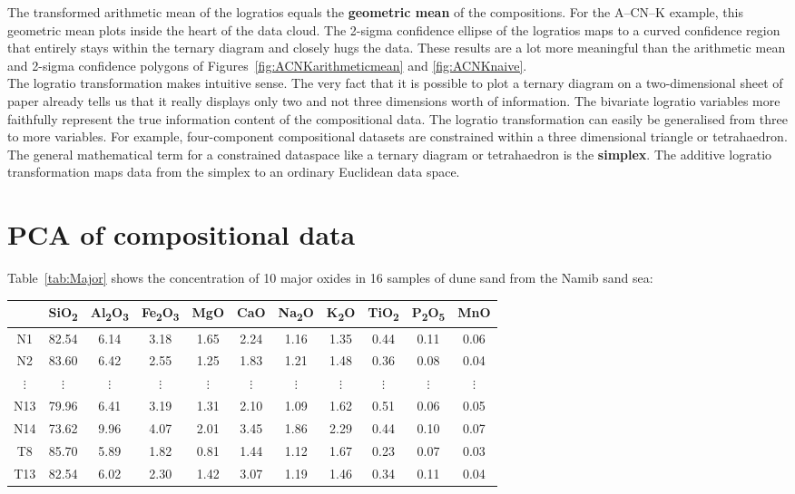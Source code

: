 The transformed arithmetic mean of the logratios equals the
\textbf{geometric mean} of the compositions. For the A--CN--K example,
this geometric mean plots inside the heart of the data cloud. The
2-sigma confidence ellipse of the logratios maps to a curved
confidence region that entirely stays within the ternary diagram and
closely hugs the data. These results are a lot more meaningful than
the arithmetic mean and 2-sigma confidence polygons of
Figures~\ref{fig:ACNKarithmeticmean} and \ref{fig:ACNKnaive}.\\

The logratio transformation makes intuitive sense. The very fact that
it is possible to plot a ternary diagram on a two-dimensional sheet of
paper already tells us that it really displays only two and not three
dimensions worth of information. The bivariate logratio variables more
faithfully represent the true information content of the compositional
data. The logratio transformation can easily be generalised from three
to more variables. For example, four-component compositional datasets
are constrained within a three dimensional triangle or tetrahaedron.
The general mathematical term for a constrained dataspace like a
ternary diagram or tetrahaedron is the \textbf{simplex}.  The additive
logratio transformation maps data from the simplex to an ordinary
Euclidean data space.

\section{PCA of compositional data}
\label{sec:compositionalPCA}

Table~\ref{tab:Major} shows the concentration of 10 major oxides in 16
samples of dune sand from the Namib sand sea:

\begin{center}
\begin{tabular}{c|cccccccccc}
 & SiO\textsubscript{2} & Al\textsubscript{2}O\textsubscript{3} & 
Fe\textsubscript{2}O\textsubscript{3} & MgO & CaO & Na\textsubscript{2}O & 
K\textsubscript{2}O & TiO\textsubscript{2} & 
P\textsubscript{2}O\textsubscript{5} & MnO\\ \hline
N1 & 82.54 & 6.14 & 3.18 & 1.65 & 2.24 & 1.16 & 1.35 & 0.44 & 0.11 & 0.06\\
N2 & 83.60 & 6.42 & 2.55 & 1.25 & 1.83 & 1.21 & 1.48 & 0.36 & 0.08 & 0.04\\
$\vdots$ & $\vdots$ & $\vdots$ & $\vdots$ & $\vdots$ & $\vdots$ &
$\vdots$ & $\vdots$ & $\vdots$ & $\vdots$ & $\vdots$ \\
N13 & 79.96 & 6.41 & 3.19 & 1.31 & 2.10 & 1.09 & 1.62 & 0.51 & 0.06 & 0.05\\
N14 & 73.62 & 9.96 & 4.07 & 2.01 & 3.45 & 1.86 & 2.29 & 0.44 & 0.10 & 0.07\\
T8 & 85.70 & 5.89 & 1.82 & 0.81 & 1.44 & 1.12 & 1.67 & 0.23 & 0.07 & 0.03\\
T13 & 82.54 & 6.02 & 2.30 & 1.42 & 3.07 & 1.19 & 1.46 & 0.34 & 0.11 & 0.04
\end{tabular}
\label{tab:Major}
\end{center}

